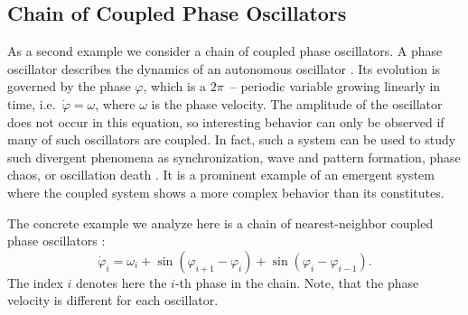 \documentclass[final]{siamltex}
\begin{document}
%
%
\subsection{Chain of Coupled Phase Oscillators}

As a second example we consider a chain of coupled phase
oscillators. A phase oscillator describes the dynamics of an
autonomous oscillator \cite{PhaseOscillator}. Its evolution is
governed by the phase $\varphi$, which is a $2\pi$~-- periodic variable growing linearly
in time, i.e.~$\dot{\varphi} = \omega$, where $\omega$ is the phase
velocity. The amplitude of the oscillator does not occur in this
equation, so interesting behavior can only be observed if many
of such oscillators are coupled. In fact, such a system can be used to
study such divergent phenomena as synchronization, wave and pattern
formation, phase chaos, or oscillation death
\cite{Synchronization-Pikovsky,Kuramoto-84}. It is a prominent example
of an emergent system where the coupled system shows a more complex
behavior than its constitutes.



The concrete example we analyze here is a chain of nearest-neighbor
coupled phase oscillators \cite{Cohen-Rand-Holmes-82}:
\begin{equation} \label{eq:phasesystem}
    \dot{\varphi}_i = \omega_i + \sin( \varphi_{i+1} - \varphi_i) + \sin( \varphi_i
    - \varphi_{i-1}).
\end{equation}
The index $i$ denotes here the $i$-th phase in the chain. Note, that
the phase velocity is different for each oscillator.
\end{document}
